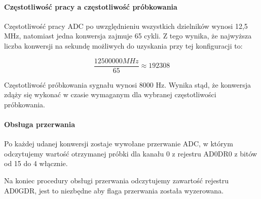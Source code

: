 \paragraph{Częstotliwość pracy a częstotliwość próbkowania}

    Częstotliwość pracy ADC po uwzględnieniu wszystkich dzielników wynosi
    12,5 MHz, natomiast jedna konwersja zajmuje 65 cykli. Z tego wynika,
    że najwyższa liczba konwersji na sekundę możliwych do uzyskania przy tej
    konfiguracji to:

    \begin{equation}
        \frac{12500000MHz}{65} \approx 192308
    \end{equation}

    Częstotliwość próbkowania sygnału wynosi 8000 Hz. Wynika stąd, że konwersja
    zdąży się wykonać w czasie wymaganym dla wybranej częstotliwości
    próbkowania.

\paragraph{Obsługa przerwania}

    Po każdej udanej konwersji zostaje wywołane przerwanie ADC, w którym
    odczytujemy wartość otrzymanej próbki dla kanału 0 z rejestru AD0DR0
    z bitów od 15 do 4 włącznie.

    Na koniec procedury obsługi przerwania odczytujemy zawartość rejestru AD0GDR,
    jest to niezbędne aby flaga przerwania została wyzerowana.
    
